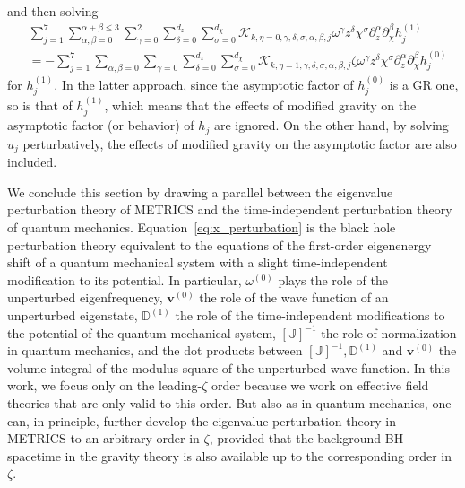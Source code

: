 \documentclass[aps,prx,amsmath,floats,floatfix,twocolumn,
  superscriptaddress,nofootinbib,showpacs]{revtex4-1}
\begin{document}
and then solving
\begin{equation}
\begin{split}
& \sum_{j=1}^{7} \sum_{\alpha, \beta = 0}^{\alpha+\beta \leq 3} \sum_{\gamma=0}^{2} \sum_{\delta=0}^{d_{z}} \sum_{\sigma=0}^{d_{\chi}} \mathcal{K}_{k, \eta = 0, \gamma, \delta, \sigma, \alpha, \beta, j} \omega^\gamma z^{\delta} \chi^{\sigma} \partial_{z}^{\alpha} \partial_{\chi}^{\beta} h^{(1)}_j \\
& = - \sum_{j=1}^{7} \sum_{\alpha, \beta = 0} \sum_{\gamma=0} \sum_{\delta=0}^{d_{z}} \sum_{\sigma=0}^{d_{\chi}} \mathcal{K}_{k, \eta = 1, \gamma, \delta, \sigma, \alpha, \beta, j} \zeta \omega^\gamma z^{\delta} \chi^{\sigma} \partial_{z}^{\alpha} \partial_{\chi}^{\beta} h_j^{(0)} 
\end{split}
\end{equation}
for $h^{(1)}_j$. 
In the latter approach, since the asymptotic factor of $h^{(0)}_j$ is a GR one, so is that of $h^{(1)}_j$, which means that the effects of modified gravity on the asymptotic factor (or behavior) of $h_j$ are ignored. 
On the other hand, by solving $u_j$ perturbatively, the effects of modified gravity on the asymptotic factor are also included. 

We conclude this section by drawing a parallel between the eigenvalue perturbation theory of METRICS and the time-independent perturbation theory of quantum mechanics. 
Equation~\eqref{eq:x_perturbation} is the black hole perturbation theory equivalent to the equations of the first-order eigenenergy shift of a quantum mechanical system with a slight time-independent modification to its potential. 
In particular, $\omega^{(0)}$ plays the role of the unperturbed eigenfrequency, $\textbf{v}^{(0)}$ the role of the wave function of an unperturbed eigenstate, $\mathbb{D}^{(1)}$ the role of the time-independent modifications to the potential of the quantum mechanical system, $[\mathbb{J}]^{-1}$ the role of normalization in quantum mechanics, and the dot products between $[\mathbb{J}]^{-1}, \mathbb{D}^{(1)}$ and $\textbf{v}^{(0)}$ the volume integral of the modulus square of the unperturbed wave function. 
In this work, we focus only on the leading-$\zeta$ order because we work on effective field theories that are only valid to this order. 
But also as in quantum mechanics, one can, in principle, further develop the eigenvalue perturbation theory in METRICS to an arbitrary order in $\zeta$, provided that the background BH spacetime in the gravity theory is also available up to the corresponding order in $\zeta$. 
\end{document}
